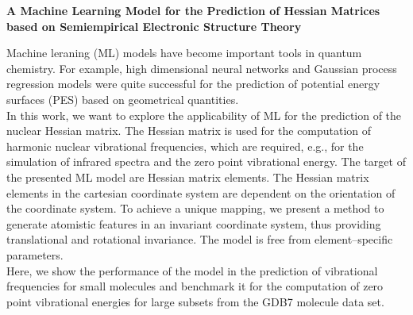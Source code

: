 \documentclass[listof= totoc]{scrreprt}
\author{Gereon Feldmann}
\numberwithin{equation}{section}
\begin{document}
\begin{center}
	\vspace*{4pt}
	\textbf{\Huge{A Machine Learning Model for the Prediction of Hessian Matrices based on Semiempirical Electronic Structure Theory}}
\end{center}

	Machine leraning (ML) models have become important tools in quantum chemistry.\cite{StriethKalthoff2020}
	For example, high dimensional neural networks and Gaussian process regression models were quite successful for the prediction of potential energy surfaces (PES) based on geometrical quantities.\cite{doi:10.1021/acs.chemrev.0c00868,PhysRevB.87.184115}\\ 
	In this work, we want to explore the applicability of ML for the prediction of the nuclear Hessian matrix.
	The Hessian matrix is used for the computation of harmonic nuclear vibrational frequencies,
	 which are required, e.g., for the simulation of infrared spectra and the zero point vibrational energy.
	\newline
	The target of the presented ML model are Hessian matrix elements.
	The Hessian matrix elements in the cartesian coordinate system are dependent on the orientation of the coordinate system.
	To achieve a unique mapping,
	we present a method to generate atomistic features in an invariant coordinate system, thus providing translational and rotational invariance.
	The model is free from element--specific parameters.\\
	Here, we show the performance of the model in the prediction of vibrational frequencies for small molecules and benchmark it for the computation of zero point vibrational energies for large subsets from the GDB7 molecule data set.
	
	\begingroup
	\renewcommand{\chapter}[2]{}
	
	\printbibliography
	\endgroup
\end{document}
